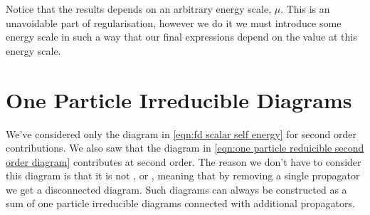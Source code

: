 \documentclass[fleqn]{NotesClass}
\begin{document}
    Notice that the results depends on an arbitrary energy scale, \(\mu\).
    This is an unavoidable part of regularisation, however we do it we must introduce some energy scale in such a way that our final expressions depend on the value at this energy scale.
    
    \section{One Particle Irreducible Diagrams}
    We've considered only the diagram in \cref{eqn:fd scalar self energy} for second order contributions.
    We also saw that the diagram in \cref{eqn:one particle reduicible second order diagram} contributes at second order.
    The reason we don't have to consider this diagram is that it is not , or , meaning that by removing a single propagator we get a disconnected diagram.
    Such diagrams can always be constructed as a sum of one particle irreducible diagrams connected with additional propagators.
    
\end{document}

